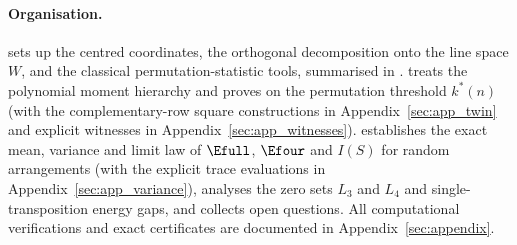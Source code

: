 \paragraph{Organisation.}
 sets up the centred coordinates, the orthogonal decomposition onto the line space $W$, and the classical permutation-statistic tools, summarised in .
 treats the polynomial moment hierarchy and proves  on the permutation threshold $k^*(n)$ (with the complementary-row square constructions in Appendix~\ref{sec:app_twin} and explicit witnesses in Appendix~\ref{sec:app_witnesses}).
 establishes the exact mean, variance and limit law of $\Efull$, $\Efour$ and $I(S)$ for random arrangements (with the explicit trace evaluations in Appendix~\ref{sec:app_variance}),  analyses the zero sets $L_3$ and $L_4$ and single-transposition energy gaps, and  collects open questions. All computational verifications and exact certificates are documented in Appendix~\ref{sec:appendix}.
